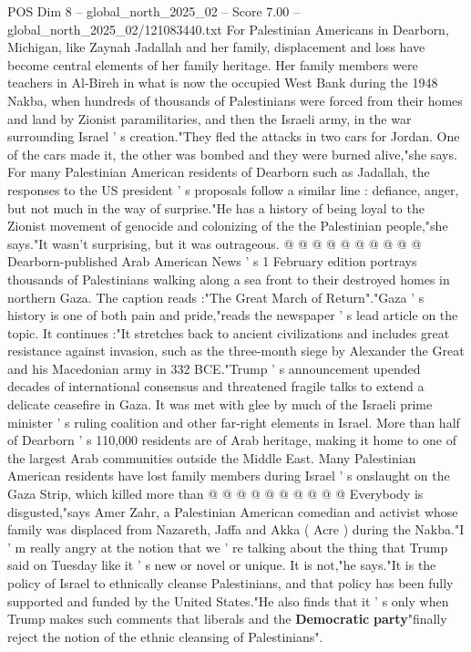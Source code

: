 \begin{textsample}{POS Dim 8 – global\_north\_2025\_02 – Score 7.00 – global\_north\_2025\_02/121083440.txt}  \label{ex:f8_pos_313}
For Palestinian Americans in Dearborn, Michigan, like Zaynah Jadallah and her family, displacement and loss have become central elements of her family heritage.
Her family members were teachers in Al-Bireh in what is now the occupied West Bank during the 1948 Nakba, when hundreds of thousands of Palestinians were forced from their homes and land by Zionist paramilitaries, and then the Israeli army, in the war surrounding Israel ' s creation."They fled the attacks in two cars for Jordan.
One of the cars made it, the other was bombed and they were burned alive,"she says.
For many Palestinian American residents of Dearborn such as Jadallah, the responses to the US president ' s proposals follow a similar line : defiance, anger, but not much in the way of surprise."He has a history of being loyal to the Zionist movement of genocide and colonizing of the the Palestinian people,"she says."It wasn't surprising, but it was outrageous. @ @ @ @ @ @ @ @ @ @ Dearborn-published Arab American News ' s 1 February edition portrays thousands of Palestinians walking along a sea front to their destroyed homes in northern Gaza.
The caption reads :"The Great March of Return"."Gaza ' s history is one of both pain and pride,"reads the newspaper ' s lead article on the topic.
It continues :"It stretches back to ancient civilizations and includes great resistance against invasion, such as the three-month siege by Alexander the Great and his Macedonian army in 332 BCE."Trump ' s announcement upended decades of international consensus and threatened fragile talks to extend a delicate ceasefire in Gaza.
It was met with glee by much of the Israeli prime minister ' s ruling coalition and other far-right elements in Israel.
More than half of Dearborn ' s 110,000 residents are of Arab heritage, making it home to one of the largest Arab communities outside the Middle East.
Many Palestinian American residents have lost family members during Israel ' s onslaught on the Gaza Strip, which killed more than @ @ @ @ @ @ @ @ @ @ Everybody is disgusted,"says Amer Zahr, a Palestinian American comedian and activist whose family was displaced from Nazareth, Jaffa and Akka ( Acre ) during the Nakba."I ' m really angry at the notion that we ' re talking about the thing that Trump said on Tuesday like it ' s new or novel or unique.
It is not,"he says."It is the policy of Israel to ethnically cleanse Palestinians, and that policy has been fully supported and funded by the United States."He also finds that it ' s only when Trump makes such comments that liberals and the \textbf{Democratic} \textbf{party}"finally reject the notion of the ethnic cleansing of Palestinians".

\end{textsample}
